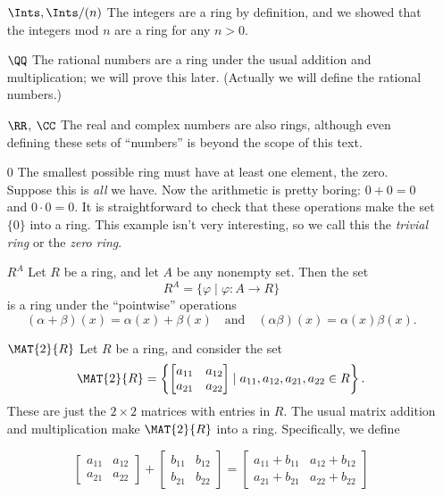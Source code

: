 \documentclass{article}
\begin{document}
\begin{itemize}
\item[$\Ints, \Ints/(n)$] The integers are a ring by definition, and we showed that the integers mod $n$ are a ring for any $n > 0$.

\item[$\QQ$] The rational numbers are a ring under the usual addition and multiplication; we will prove this later. (Actually we will define the rational numbers.)

\item[$\RR$, $\CC$] The real and complex numbers are also rings, although even defining these sets of ``numbers'' is beyond the scope of this text.

\item[$0$] The smallest possible ring must have at least one element, the zero. Suppose this is \emph{all} we have. Now the arithmetic is pretty boring: $0+0 = 0$ and $0 \cdot 0 = 0$. It is straightforward to check that these operations make the set $\{0\}$ into a ring. This example isn't very interesting, so we call this the \emph{trivial ring} or the \emph{zero ring}.

\item[$R^A$] Let $R$ be a ring, and let $A$ be any nonempty set. Then the set \[ R^A = \{ \varphi \mid \varphi : A \rightarrow R \} \] is a ring under the ``pointwise'' operations \[ (\alpha + \beta)(x) = \alpha(x) + \beta(x) \quad \mathrm{and} \quad (\alpha\beta)(x) = \alpha(x) \beta(x). \]

\item[$\MAT{2}{R}$] Let $R$ be a ring, and consider the set \[ \MAT{2}{R} = \left\{ \begin{bmatrix} a_{11} & a_{12} \\ a_{21} & a_{22} \end{bmatrix} \mid a_{11}, a_{12}, a_{21}, a_{22} \in R \right\}. \] These are just the $2 \times 2$ matrices with entries in $R$. The usual matrix addition and multiplication make $\MAT{2}{R}$ into a ring. Specifically, we define

\[\begin{bmatrix} a_{11} & a_{12} \\ a_{21} & a_{22} \end{bmatrix} + \begin{bmatrix} b_{11} & b_{12} \\ b_{21} & b_{22} \end{bmatrix} = \begin{bmatrix} a_{11} + b_{11} & a_{12} + b_{12} \\ a_{21} + b_{21} & a_{22} + b_{22} \end{bmatrix}\]


\end{itemize}
\end{document}
